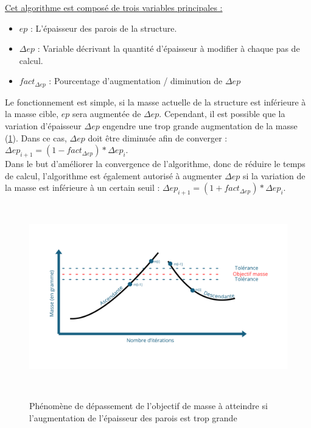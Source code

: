 \documentclass[a4paper]{article}
\begin{document}
	\underline{Cet algorithme est composé de trois variables principales :}
	
	\begin{itemize}
		\item $ep$ : L’épaisseur des parois de la structure.
		\item $\Delta ep$ : Variable décrivant la quantité d’épaisseur à modifier à chaque pas de calcul.
		\item $fact_{\Delta ep}$ : Pourcentage d’augmentation / diminution de $\Delta ep$
	\end{itemize}

	Le fonctionnement est simple, si la masse actuelle de la structure est inférieure à la masse cible, $ep$ sera augmentée de $\Delta ep$. Cependant, il est possible que la variation d’épaisseur $\Delta ep$ engendre une trop grande augmentation de la masse (\ref{trop_grande_aug_ep}). Dans ce cas, $\Delta ep$ doit être diminuée afin de converger : $\Delta ep_{i+1} = (1 - fact_{\Delta ep}) * \Delta ep_{i}$.\\
	
	Dans le but d’améliorer la convergence de l’algorithme, donc de réduire le temps de calcul, l’algorithme est également autorisé à augmenter $\Delta ep$ si la variation de la masse est inférieure à un certain seuil : $\Delta ep_{i+1} = (1 + fact_{\Delta ep}) * \Delta ep_{i}$.
	
	\begin{figure}[H]
		\centering
		\includegraphics[height=8cm]{Images/4/tolerance.pdf}\\
		\caption{Phénomène de dépassement de l'objectif de masse à atteindre si l'augmentation de l'épaisseur des parois est trop grande}
		\label{trop_grande_aug_ep}
	\end{figure}
	\newpage
			
\end{document}
